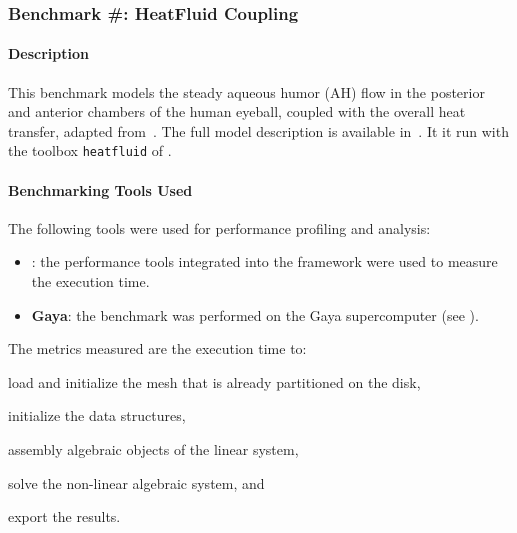 



\subsubsection{Benchmark \#: HeatFluid Coupling}
\label{sec:WP1:Feelpp:benchmark4}

\newcommand{\vct}[1]{\vec{#1}}
\newcommand{\mat}[1]{\underline{\underline{#1}}}





\paragraph{Description}
This benchmark models the steady aqueous humor (AH) flow in the posterior and anterior chambers of the human eyeball, coupled with the overall heat transfer, adapted from~\cite{ooi_simulation_2008,kilgour_operator_2021}.
The full model description is available in~\cite{saigre_coupled_2024_abstract}.
It it run with the toolbox \texttt{heatfluid} of \Feelpp.


\paragraph{Benchmarking Tools Used}

The following tools were used for performance profiling and analysis:
\begin{itemize}
    \item \textbf{\Feelpp}: the performance tools integrated into the \Feelpp framework were used to measure the execution time.
    \item \textbf{Gaya}: the benchmark was performed on the Gaya supercomputer (see ).
\end{itemize}

The metrics measured are the execution time to:
\begin{inparaenum}[\it (i)]
    \item load and initialize the mesh that is already partitioned on the disk,
    \item initialize the data structures,
    \item assembly algebraic objects of the linear system,
    \item solve the non-linear algebraic system, and
    \item export the results.
\end{inparaenum}


